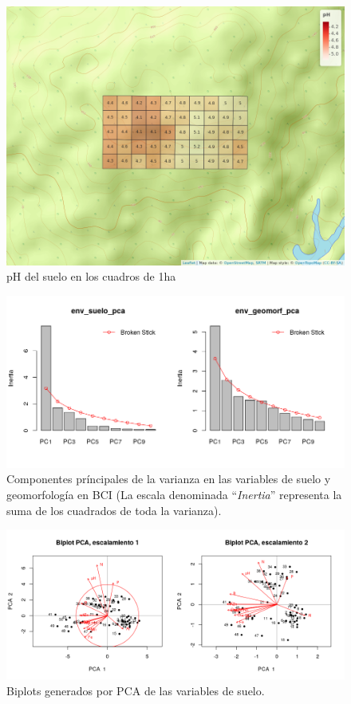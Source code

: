 \documentclass[11pt,]{article}
\begin{document}
\begin{figure}
\centering
\includegraphics{mapa_cuadros_ph.png}
\caption{pH del suelo en los cuadros de 1ha \label{fig:mapa_cuadros_ph}}
\end{figure}

\begin{figure}
\centering
\includegraphics{env_suelo_geomorf_pca_br_stick.png}
\caption{Componentes príncipales de la varianza en las variables de
suelo y geomorfología en BCI (La escala denominada ``\emph{Inertia}''
representa la suma de los cuadrados de toda la varianza).
\label{fig:pca_suelo_geomorf_br_stick}}
\end{figure}

\begin{figure}
\centering
\includegraphics{pca_biplot_suelo.png}
\caption{Biplots generados por PCA de las variables de suelo.
\label{fig:pca_biplot_suelo}}
\end{figure}
\end{document}
